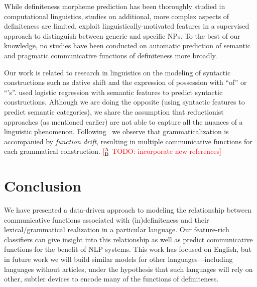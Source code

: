 \documentclass[11pt,letterpaper]{article}
\newcommand{\ensuretext}[1]{#1}
\newcommand{\nssmarker}{\ensuretext{\textcolor{magenta}{\ensuremath{^{\textsc{NS}}_{\textsc{S}}}}}}
\newcommand{\abmarker}{\ensuretext{\textcolor{red}{\ensuremath{^{\textsc{A}}_{\textsc{B}}}}}}
\newcommand{\ytmarker}{\ensuretext{\textcolor{blue}{\ensuremath{^{\textsc{Y}}_{\textsc{T}}}}}}
\newcommand{\arkcomment}[3]{\ensuretext{\textcolor{#3}{[#1 #2]}}}
\newcommand{\nss}[1]{\arkcomment{\nssmarker}{#1}{magenta}}
\newcommand{\ab}[1]{\arkcomment{\abmarker}{#1}{red}}
\newcommand{\yt}[1]{\arkcomment{\ytmarker}{#1}{blue}}
\newcommand{\finalversion}[1]{}
\begin{document}
While definiteness morpheme prediction has been thoroughly studied in computational linguistics, 
studies on additional, more complex aspects of definiteness are limited.  
\citet{reiter10}  exploit linguistically-motivated features in a supervised approach to 
distinguish between generic and specific NPs.\finalversion{\yt{what else?}}
To the best of our knowledge, no studies have been conducted 
on automatic prediction of semantic and pragmatic communicative functions of definiteness more broadly. 



Our work is related to research in linguistics on the modeling of syntactic constructions 
such as dative shift and the expression of possession with ``of'' or ``'s''.  
\citet{bresnan10} used logistic regression with semantic features to predict syntactic constructions.   
Although we are doing the opposite (using syntactic features to predict semantic categories), 
we share the assumption that reductionist approaches (as mentioned earlier) are not able to capture all the nuances of a linguistic phenomenon. 
Following~\citet{hopper-03} we observe that grammaticalization is accompanied by {\em function drift}, 
resulting in multiple communicative functions for each grammatical construction. 
\ab{TODO: incorporate new references}



\section{Conclusion}\label{sec:conclusion}

We have presented a data-driven approach to modeling the relationship between 
communicative functions associated with (in)definiteness and their lexical\slash grammatical realization in a particular language.
Our feature-rich classifiers can give insight into this relationship
as well as predict communicative functions for the benefit of NLP systems.
This work has focused on English, but in future work we will build similar models for other languages---including 
languages without articles, under the hypothesis that such languages will rely on other, subtler devices to encode
many of the functions of definiteness.





\setlength{\bibsep}{10pt}
{\fontsize{10}{12.25}\selectfont
}
\end{document}
